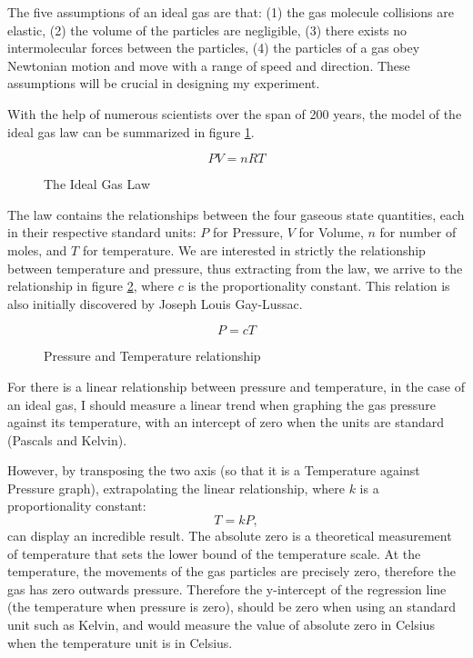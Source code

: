 \documentclass[a4paper,12pt]{article}
\begin{document}
The five assumptions of an ideal gas are that: (1) the gas molecule collisions are elastic, (2) the volume of the particles are negligible, (3) there exists no intermolecular forces between the particles, (4) the particles of a gas obey Newtonian motion and move with a range of speed and direction. These assumptions will be crucial in designing my experiment.

With the help of numerous scientists over the span of 200 years, the model of the ideal gas law can be summarized in figure \ref{fig:igl}.

\begin{figure}[H]
    \[
    PV = nRT
    \]
    \caption{The Ideal Gas Law}
    \label{fig:igl}
\end{figure}

The law contains the relationships between the four gaseous state quantities, each in their respective standard units: $P$ for Pressure, $V$ for Volume, $n$ for number of moles, and $T$ for temperature. We are interested in strictly the relationship between temperature and pressure, thus extracting from the law, we arrive to the relationship in figure \ref{fig:pt}, where $c$ is the proportionality constant. This relation is also initially discovered by Joseph Louis Gay-Lussac.

\begin{figure}[H]
    \[
    P = cT
    \]
    \caption{Pressure and Temperature relationship}
    \label{fig:pt}
\end{figure}

For there is a linear relationship between pressure and temperature, in the case of an ideal gas, I should measure a linear trend when graphing the gas pressure against its temperature, with an intercept of zero when the units are standard (Pascals and Kelvin).


However, by transposing the two axis (so that it is a Temperature against Pressure graph), extrapolating the linear relationship, where $k$ is a proportionality constant:
\[
    T = kP,
\]
can display an incredible result. The absolute zero is a theoretical measurement of temperature that sets the lower bound of the temperature scale. At the temperature, the movements of the gas particles are precisely zero, therefore the gas has zero outwards pressure. Therefore the y-intercept of the regression line (the temperature when pressure is zero), should be zero when using an standard unit such as Kelvin, and would measure the value of absolute zero in Celsius when the temperature unit is in Celsius.
\end{document}
